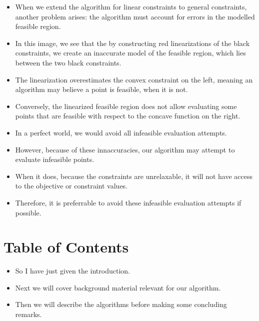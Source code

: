 \documentclass{article}
\begin{document}
\hrulefill

\begin{itemize}
\item When we extend the algorithm for linear constraints to general constraints, another problem arises: the algorithm must account for errors in the modelled feasible region.
\item In this image, we see that the by constructing red linearizations of the black constraints, we create an inaccurate model of the feasible region, which lies between the two black constraints.
\item The linearization overestimates the convex constraint on the left, meaning an algorithm may believe a point is feasible, when it is not.
\item Conversely, the linearized feasible region does not allow evaluating some points that are feasible with respect to the concave function on the right.
\item In a perfect world, we would avoid all infeasible evaluation attempts.
\item However, because of these innaccuracies, our algorithm may attempt to evaluate infeasible points.
\item When it does, because the constraints are unrelaxable, it will not have access to the objective or constraint values.
\item Therefore, it is preferrable to avoid these infeasible evaluation attempts if possible.
\end{itemize}

	\section{Table of Contents}
\begin{itemize}
\item So I have just given the introduction.
\item Next we will cover background material relevant for our algorithm.
\item Then we will describe the algorithms before making some concluding remarks.
\end{itemize}
\end{document}
